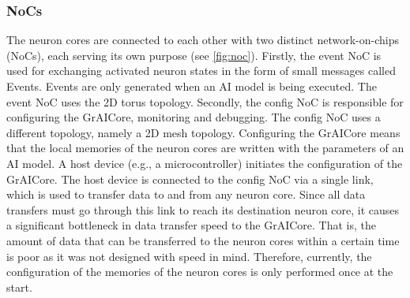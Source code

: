 \subsubsection{NoCs}
The neuron cores are connected to each other with two distinct network-on-chips (NoCs), each serving its own purpose (see \cref{fig:noc}).
Firstly, the event NoC is used for exchanging activated neuron states in the form of small messages called Events.
Events are only generated when an AI model is being executed.
The event NoC uses the 2D torus topology.
Secondly, the config NoC is responsible for configuring the GrAICore, monitoring and debugging.
The config NoC uses a different topology, namely a 2D mesh topology.
Configuring the GrAICore means that the local memories of the neuron cores are written with the parameters of an AI model.
A host device (e.g., a microcontroller) initiates the configuration of the GrAICore.
The host device is connected to the config NoC via a single link, which is used to transfer data to and from any neuron core.
Since all data transfers must go through this link to reach its destination neuron core, it causes a significant bottleneck in data transfer speed to the GrAICore.
That is, the amount of data that can be transferred to the neuron cores within a certain time is poor as it was not designed with speed in mind.
Therefore, currently, the configuration of the memories of the neuron cores is only performed once at the start.

